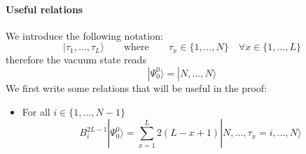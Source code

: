 \documentclass[10pt]{article}
\numberwithin{equation}{section}
\numberwithin{equation}{subsection}
\begin{document}
\paragraph{Useful relations}
We introduce the following notation:
\begin{equation}
	|\tau_{1},\ldots,\tau_{L}\rangle\qquad \text{where}\qquad \tau_{x}\in\{1,\ldots,N\}\quad \forall x\in \{1,\ldots,L\}
\end{equation}
therefore the vacuum state reads
\begin{equation}
	|\Psi_{0}^{0}\rangle=|N,\ldots,N\rangle
\end{equation}
We first write some relations that will be useful in the proof:
\begin{itemize}
	\item For all $i\in\{1,\ldots,N-1\}$
	\begin{equation}\label{BActionVoid}
		B_{i}^{2L-1}|\Psi_{0}^{0}\rangle=\sum_{x=1}^{L}2(L-x+1)|N,\ldots,\tau_{x}=i,\ldots,N\rangle
	\end{equation}


\end{itemize}
\end{document}

